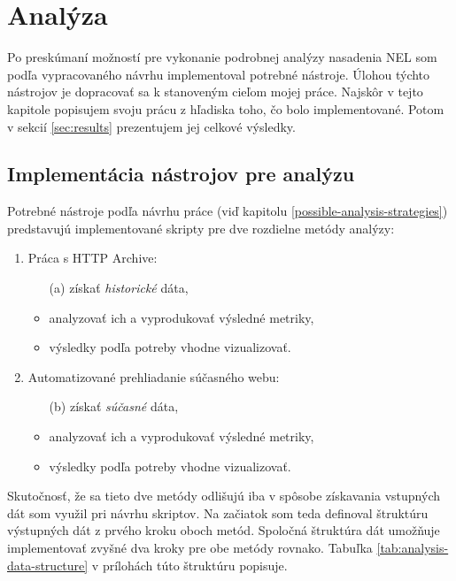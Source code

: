 \chapter{Analýza}

Po preskúmaní možností pre vykonanie podrobnej analýzy nasadenia NEL som podľa vypracovaného návrhu implementoval potrebné nástroje.
Úlohou týchto nástrojov je dopracovať sa k stanoveným cieľom mojej práce.  
Najskôr v tejto kapitole popisujem svoju prácu z hľadiska toho, čo bolo implementované.
Potom v sekcií \ref{sec:results} prezentujem jej celkové výsledky.


\section{Implementácia nástrojov pre analýzu}

Potrebné nástroje podľa návrhu práce (viď kapitolu \ref{possible-analysis-strategies}) predstavujú implementované skripty pre dve rozdielne metódy analýzy:
\begin{enumerate}
    \item Práca s HTTP Archive:
    \begin{itemize}
        \item[(a)] získať \textit{historické} dáta, 
        \item analyzovať ich a vyprodukovať výsledné metriky,
        \item výsledky podľa potreby vhodne vizualizovať.
    \end{itemize}

    \item Automatizované prehliadanie súčasného webu:
    \begin{itemize}
        \item[(b)] získať \textit{súčasné} dáta,
        \item analyzovať ich a vyprodukovať výsledné metriky, 
        \item výsledky podľa potreby vhodne vizualizovať.
    \end{itemize}
\end{enumerate}

Skutočnosť, že sa tieto dve metódy odlišujú iba v spôsobe získavania vstupných dát som využil pri návrhu skriptov.
Na začiatok som teda definoval štruktúru výstupných dát z prvého kroku oboch metód.
Spoločná štruktúra dát umožňuje implementovať zvyšné dva kroky pre obe metódy rovnako.
Tabuľka \ref{tab:analysis-data-structure} v prílohách túto štruktúru popisuje. 

